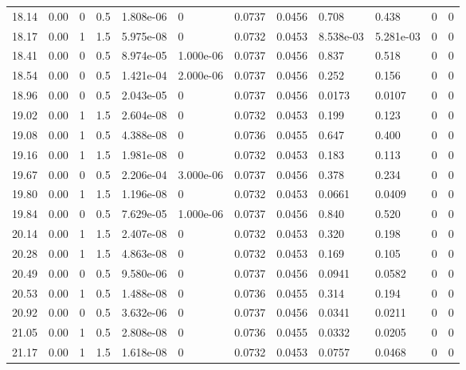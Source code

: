 \documentclass[preview]{standalone}
\begin{document}
{{{\begin{tabular}{L{1.2cm}C{1.2cm} C{0.3cm}C{0.5cm} C{1.4cm}C{1.4cm} C{1.4cm}C{1.4cm} C{1.6cm}C{1.6cm} C{1.6cm}C{1.6cm}}
  18.14  &  0.00  & 0     & 0.5 &  1.808e-06  & 0  &  0.0737&   0.0456& 0.708 & 0.438   &  0 & 0  \\ 
  18.17  &  0.00  & 1     & 1.5 &  5.975e-08  & 0  &  0.0732&   0.0453& 8.538e-03 & 5.281e-03   &  0 & 0  \\ 
  18.41  &  0.00  & 0     & 0.5 &  8.974e-05  & 1.000e-06  &  0.0737&   0.0456& 0.837 & 0.518   &  0 & 0  \\ 
  18.54  &  0.00  & 0     & 0.5 &  1.421e-04  & 2.000e-06  &  0.0737&   0.0456& 0.252 & 0.156   &  0 & 0  \\ 
  18.96  &  0.00  & 0     & 0.5 &  2.043e-05  & 0  &  0.0737&   0.0456& 0.0173 & 0.0107   &  0 & 0  \\ 
  19.02  &  0.00  & 1     & 1.5 &  2.604e-08  & 0  &  0.0732&   0.0453& 0.199 & 0.123   &  0 & 0  \\ 
  19.08  &  0.00  & 1     & 0.5 &  4.388e-08  & 0  &  0.0736&   0.0455& 0.647 & 0.400   &  0 & 0  \\ 
  19.16  &  0.00  & 1     & 1.5 &  1.981e-08  & 0  &  0.0732&   0.0453& 0.183 & 0.113   &  0 & 0  \\ 
  19.67  &  0.00  & 0     & 0.5 &  2.206e-04  & 3.000e-06  &  0.0737&   0.0456& 0.378 & 0.234   &  0 & 0  \\ 
  19.80  &  0.00  & 1     & 1.5 &  1.196e-08  & 0  &  0.0732&   0.0453& 0.0661 & 0.0409   &  0 & 0  \\ 
  19.84  &  0.00  & 0     & 0.5 &  7.629e-05  & 1.000e-06  &  0.0737&   0.0456& 0.840 & 0.520   &  0 & 0  \\ 
  20.14  &  0.00  & 1     & 1.5 &  2.407e-08  & 0  &  0.0732&   0.0453& 0.320 & 0.198   &  0 & 0  \\ 
  20.28  &  0.00  & 1     & 1.5 &  4.863e-08  & 0  &  0.0732&   0.0453& 0.169 & 0.105   &  0 & 0  \\ 
  20.49  &  0.00  & 0     & 0.5 &  9.580e-06  & 0  &  0.0737&   0.0456& 0.0941 & 0.0582   &  0 & 0  \\ 
  20.53  &  0.00  & 1     & 0.5 &  1.488e-08  & 0  &  0.0736&   0.0455& 0.314 & 0.194   &  0 & 0  \\ 
  20.92  &  0.00  & 0     & 0.5 &  3.632e-06  & 0  &  0.0737&   0.0456& 0.0341 & 0.0211   &  0 & 0  \\ 
  21.05  &  0.00  & 1     & 0.5 &  2.808e-08  & 0  &  0.0736&   0.0455& 0.0332 & 0.0205   &  0 & 0  \\ 
  21.17  &  0.00  & 1     & 1.5 &  1.618e-08  & 0  &  0.0732&   0.0453& 0.0757 & 0.0468   &  0 & 0  \\ 

\end{tabular}}}}
\end{document}
